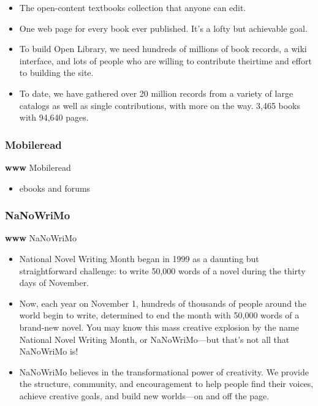 \documentclass[
]{article}
\providecommand{\tightlist}{%
  \setlength{\itemsep}{0pt}\setlength{\parskip}{0pt}}
\begin{document}
\begin{itemize}
\item
  The open-content textbooks collection that anyone can edit.
\item
  One web page for every book ever published. It's a lofty but
  achievable goal.
\item
  To build Open Library, we need hundreds of millions of book records, a
  wiki interface, and lots of people who are willing to contribute
  theirtime and effort to building the site.
\item
  To date, we have gathered over 20 million records from a variety of
  large catalogs as well as single contributions, with more on the way.
  3,465 books with 94,640 pages.
\end{itemize}

\subsubsection{Mobileread}

\textbf{www} Mobileread

\begin{itemize}
\tightlist
\item
  ebooks and forums
\end{itemize}

\subsubsection{NaNoWriMo}

\textbf{www} NaNoWriMo

\begin{itemize}
\item
  National Novel Writing Month began in 1999 as a daunting but
  straightforward challenge: to write 50,000 words of a novel during the
  thirty days of November.
\item
  Now, each year on November 1, hundreds of thousands of people around
  the world begin to write, determined to end the month with 50,000
  words of a brand-new novel. You may know this mass creative explosion
  by the name National Novel Writing Month, or NaNoWriMo---but that's
  not all that NaNoWriMo is!
\item
  NaNoWriMo believes in the transformational power of creativity. We
  provide the structure, community, and encouragement to help people
  find their voices, achieve creative goals, and build new worlds---on
  and off the page.
\end{itemize}
\end{document}
